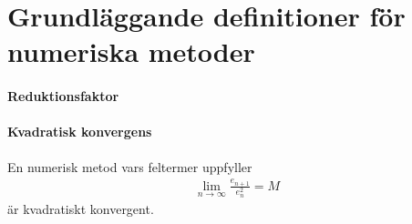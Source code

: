 \section{Grundläggande definitioner för numeriska metoder}

\paragraph{Reduktionsfaktor}

\paragraph{Kvadratisk konvergens}
En numerisk metod vars feltermer uppfyller
\begin{align*}
	\lim\limits_{n\to\infty}\frac{e_{n + 1}}{e_{n}^{2}} = M
\end{align*}
är kvadratiskt konvergent.